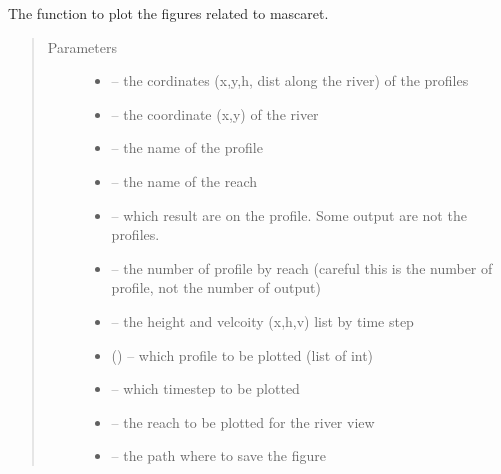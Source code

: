 \documentclass[letterpaper,10pt,english]{sphinxmanual}
\begin{document}
\begin{fulllineitems}
\label{\detokenize{index:src.mascaret.figure_mascaret}}
The function to plot the figures related to mascaret.
\begin{quote}\begin{description}
\item[{Parameters}] \leavevmode\begin{itemize}
\item {} 
 -- the cordinates (x,y,h, dist along the river) of the profiles

\item {} 
 -- the coordinate (x,y) of the river

\item {} 
 -- the name of the profile

\item {} 
 -- the name of the reach

\item {} 
 -- which result are on the profile. Some output are not the profiles.

\item {} 
 -- the number of profile by reach (careful this is the number of profile, not the number of output)

\item {} 
 -- the height and velcoity (x,h,v) list by time step

\item {} 
 () -- which profile to be plotted (list of int)

\item {} 
 -- which timestep to be plotted

\item {} 
 -- the reach to be plotted for the river view

\item {} 
 -- the path where to save the figure

\end{itemize}

\end{description}\end{quote}

\end{fulllineitems}
\end{document}
